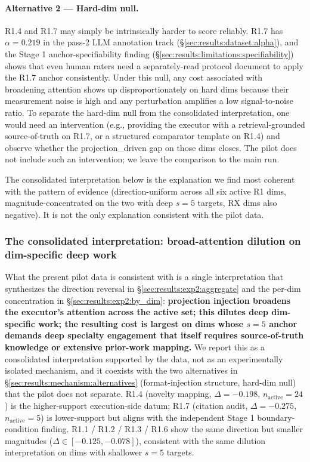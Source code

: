 \paragraph{Alternative 2 --- Hard-dim null.} R1.4 and R1.7 may simply be intrinsically harder to score reliably. R1.7 has $\alpha = 0.219$ in the pass-2 LLM annotation track (\S\ref{sec:results:dataset:alpha}), and the Stage 1 anchor-specifiability finding (\S\ref{sec:results:limitations:specifiability}) shows that even human raters need a separately-read protocol document to apply the R1.7 anchor consistently. Under this null, any cost associated with broadening attention shows up disproportionately on hard dims because their measurement noise is high and any perturbation amplifies a low signal-to-noise ratio. To separate the hard-dim null from the consolidated interpretation, one would need an intervention (e.g., providing the executor with a retrieval-grounded source-of-truth on R1.7, or a structured comparator template on R1.4) and observe whether the projection\_driven gap on those dims closes. The pilot does not include such an intervention; we leave the comparison to the main run.

The consolidated interpretation below is the explanation we find most coherent with the pattern of evidence (direction-uniform across all six active R1 dims, magnitude-concentrated on the two with deep $s = 5$ targets, RX dims also negative). It is not the only explanation consistent with the pilot data.


\subsubsection{The consolidated interpretation: broad-attention dilution on dim-specific deep work}
\label{sec:results:mechanism:dilution}

What the present pilot data is consistent with is a single interpretation that synthesizes the direction reversal in \S\ref{sec:results:exp2:aggregate} and the per-dim concentration in \S\ref{sec:results:exp2:by_dim}: \textbf{projection injection broadens the executor's attention across the active set; this dilutes deep dim-specific work; the resulting cost is largest on dims whose $s = 5$ anchor demands deep specialty engagement that itself requires source-of-truth knowledge or extensive prior-work mapping.} We report this as a consolidated interpretation supported by the data, not as an experimentally isolated mechanism, and it coexists with the two alternatives in \S\ref{sec:results:mechanism:alternatives} (format-injection structure, hard-dim null) that the pilot does not separate. R1.4 (novelty mapping, $\Delta = -0.198$, $n_{\text{active}} = 24$) is the higher-support execution-side datum; R1.7 (citation audit, $\Delta = -0.275$, $n_{\text{active}} = 5$) is lower-support but aligns with the independent Stage 1 boundary-condition finding. R1.1 / R1.2 / R1.3 / R1.6 show the same direction but smaller magnitudes ($\Delta \in [-0.125, -0.078]$), consistent with the same dilution interpretation on dims with shallower $s = 5$ targets.

